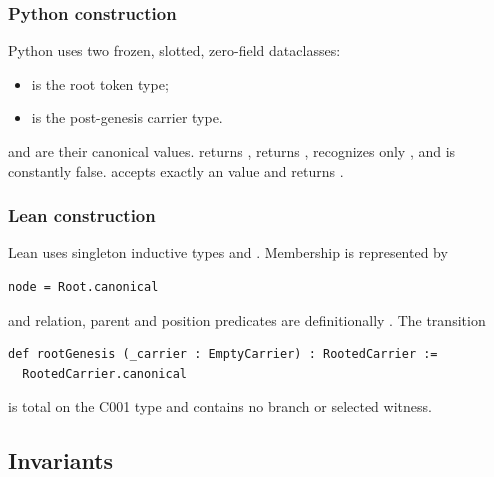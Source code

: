 \subsubsection{Python construction}\label{python-construction}

Python uses two frozen, slotted, zero-field dataclasses:

\begin{itemize}
\tightlist
\item
  \texttt{\protect{}} is the root token type;
\item
  \texttt{\protect{}} is the post-genesis carrier type.
\end{itemize}

\texttt{\protect{}} and \texttt{\protect{}} are their canonical values.
\texttt{\protect{}} returns \texttt{\protect{}},
\texttt{\protect{}} returns \texttt{\protect\seqsplit{()}}, \texttt{\protect{}}
recognizes only \texttt{\protect{}}, and \texttt{\protect{}} is
constantly false. \texttt{\protect{}} accepts exactly an
\texttt{\protect{}} value and returns \texttt{\protect{}}.

\subsubsection{Lean construction}\label{lean-construction}

Lean uses singleton inductive types \texttt{\protect{}} and
\texttt{\protect{}}. Membership is represented by

\begin{verbatim}
node = Root.canonical
\end{verbatim}

and relation, parent and position predicates are definitionally
\texttt{\protect{}}. The transition

\begin{verbatim}
def rootGenesis (_carrier : EmptyCarrier) : RootedCarrier :=
  RootedCarrier.canonical
\end{verbatim}

is total on the C001 type and contains no branch or selected witness.

\subsection{Invariants}\label{invariants}

